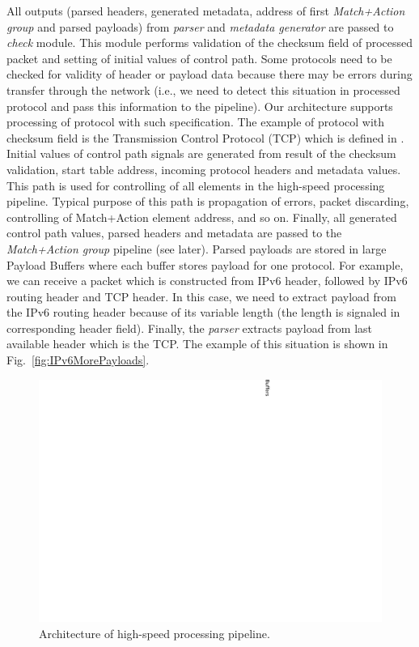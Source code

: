 All outputs (parsed headers, generated metadata, address of first \emph{Match+Action group} and parsed payloads) from \emph{parser} 
and \emph{metadata generator} are passed to 
\emph{check} module. This module performs validation of the checksum field of processed packet and setting of initial values of 
control path.
Some protocols need to be checked for validity of header or payload data because there may be errors during transfer through the network
(i.e., we need to detect this situation in processed protocol and pass this information to the pipeline). 
Our architecture supports processing of protocol with such specification. 
The example of protocol with checksum field is the Transmission Control Protocol (TCP) which is defined in \cite{rfc793-TCP}.
Initial values of control path signals are generated from result of the checksum validation, start table address, incoming protocol headers
and metadata values. 
This path is used for controlling of all elements in the high-speed processing pipeline. 
Typical purpose of this path is propagation of errors, packet discarding, controlling of Match+Action element address, and so on. 
Finally, all generated control path values, parsed headers and metadata are passed to the \emph{Match+Action group} pipeline (see later). 
Parsed payloads are stored in large Payload Buffers where each buffer stores payload for one protocol. 
For example, we can receive a packet which is constructed from IPv6 header, followed by IPv6 routing header and TCP header. 
In this case, we need to extract payload from the IPv6 routing header because of its variable length 
(the length is signaled in corresponding header field). Finally, the \textit{parser} extracts payload from last available header which is the TCP.
The example of this situation is shown in Fig.~\ref{fig:IPv6MorePayloads}.

\begin{figure}
    \includegraphics[height=\textheight,width=\textwidth,keepaspectratio]{chapters/pic/p4-pipeline}
    \caption{Architecture of high-speed processing pipeline.}
    \label{fig:p4PipelineArchitecture}
\end{figure}

